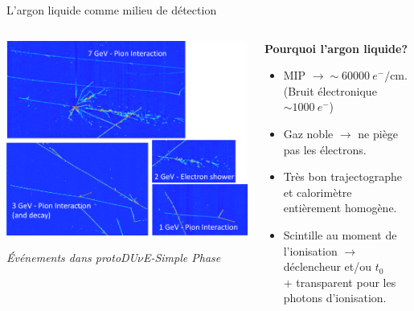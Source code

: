   \begin{frame}{L'argon liquide comme milieu de détection}
 	  \begin{scriptsize}
       	\begin{columns}
       		\begin{column}{0.6\textwidth}
       			\centering
       			\includegraphics[width=\textwidth]{./pictures/SP_evt.png}\\
       			\flushleft
       			\begin{footnotesize}\textit{Événements dans protoDU$\nu$E-Simple Phase}\end{footnotesize}
       		\end{column}
       		\begin{column}{0.4\textwidth}
       			\begin{footnotesize}
       				\textbf{Pourquoi l'argon liquide?}
       			\end{footnotesize}
       			\begin{itemize}
       				\item MIP $\rightarrow\sim\SI{60000}{e^-\per\centi\meter}$. \\
       				(Bruit électronique $\sim \SI{1000}{e^-}$)
       				\item Gaz noble $\rightarrow$ ne piège pas les électrons.
       				\item Très bon trajectographe et calorimètre entièrement homogène.
       				\item Scintille au moment de l'ionisation $\rightarrow$ déclencheur et/ou $t_0$ \\ + transparent pour les photons  d'ionisation.

\end{itemize}
\end{column}
\end{columns}
\end{scriptsize}
\end{frame}
